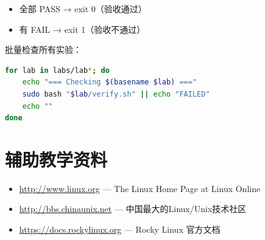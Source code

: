 \documentclass[12pt,a4paper]{ctexart}
\begin{document}
\begin{itemize}
  \item 全部 PASS → exit 0（验收通过）
  \item 有 FAIL → exit 1（验收不通过）
\end{itemize}

批量检查所有实验：

\begin{cmdbox}
\begin{lstlisting}[language=bash]
for lab in labs/lab*; do
    echo "=== Checking $(basename $lab) ==="
    sudo bash "$lab/verify.sh" || echo "FAILED"
    echo ""
done
\end{lstlisting}
\end{cmdbox}

\section{辅助教学资料}

\begin{itemize}
  \item \url{http://www.linux.org} — The Linux Home Page at Linux Online
  \item \url{http://bbs.chinaunix.net} — 中国最大的Linux/Unix技术社区
  \item \url{https://docs.rockylinux.org} — Rocky Linux 官方文档
\end{itemize}
\end{document}
